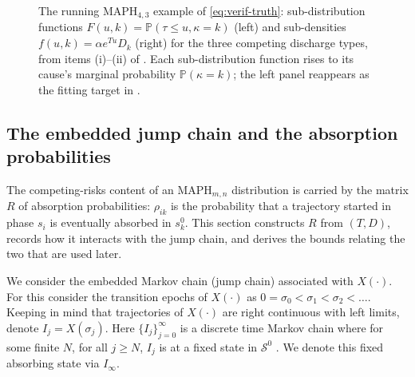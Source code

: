 \documentclass{article}
\newcommand{\Prob}{\mathbb{P}}
\newcommand{\cs}{\mathcal{S}}
\newcommand{\subchg}[1]{#1}
\begin{document}
\begin{figure}[ht]
\begin{minipage}{0.49\textwidth}
\end{minipage}
\caption{The running $\text{MAPH}_{4,3}$ example of \eqref{eq:verif-truth}: sub-distribution functions $F(u,k)=\Prob(\tau\le u,\kappa=k)$ (left) and sub-densities $f(u,k)=\alpha e^{Tu}D_k$ (right) for the three competing discharge types, from items (i)--(ii) of . Each sub-distribution function rises to its cause's marginal probability $\Prob(\kappa=k)$; the left panel reappears as the fitting target in .}
\label{fig:running-subdist}
\end{figure}

\subsection{The embedded jump chain and the absorption probabilities}
\label{sec:second-param}

\subchg{The competing-risks content of an $\text{MAPH}_{m,n}$ distribution is carried by the matrix
$R$ of absorption probabilities: $\rho_{ik}$ is the probability that a trajectory started in phase
$s_i$ is eventually absorbed in $s^0_k$. This section constructs $R$ from $(T,D)$, records how it
interacts with the jump chain, and derives the bounds relating the two that are used later.}

We consider the embedded Markov chain (jump chain) associated with $X(\cdot)$. For this consider the transition epochs of $X(\cdot)$ as $0 = \sigma_0 < \sigma_1 < \sigma_2 < \ldots$. Keeping in mind that trajectories of $X(\cdot)$ are right continuous with left limits, denote $I_j=X(\sigma_j)$. Here $\{I_j\}_{j=0}^\infty$ is a discrete time Markov chain where for some finite $N$, for all $j \ge N$, $I_j$ is at a fixed state in $\cs^0$ . We denote this fixed absorbing state via $I_\infty$. 
\end{document}
